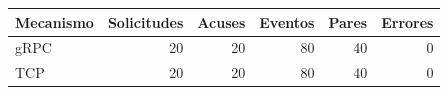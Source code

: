 \begin{tabular}{lrrrrr}
\toprule
Mecanismo & Solicitudes & Acuses & Eventos & Pares & Errores \\
\midrule
gRPC & 20 & 20 & 80 & 40 & 0 \\
TCP & 20 & 20 & 80 & 40 & 0 \\
\bottomrule
\end{tabular}
